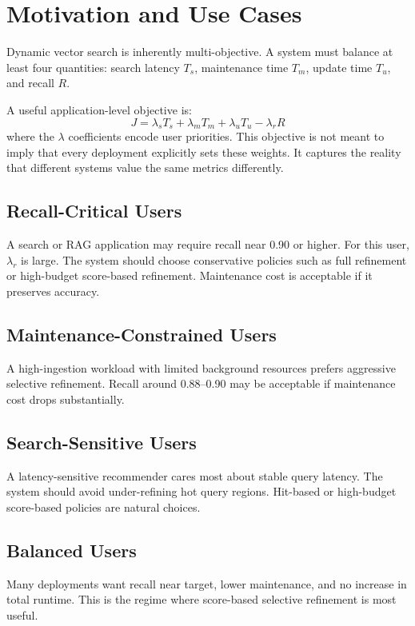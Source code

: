 \documentclass[sigconf, nonacm]{acmart}
\begin{document}
\section{Motivation and Use Cases}
\label{sec:motivation}

Dynamic vector search is inherently multi-objective. A system must
balance at least four quantities: search latency $T_s$, maintenance
time $T_m$, update time $T_u$, and recall $R$.

A useful application-level objective is:
\begin{equation}
  J = \lambda_s T_s + \lambda_m T_m + \lambda_u T_u - \lambda_r R
\end{equation}
where the $\lambda$ coefficients encode user priorities. This objective
is not meant to imply that every deployment explicitly sets these
weights. It captures the reality that different systems value the same
metrics differently.

\subsection{Recall-Critical Users}
A search or RAG application may require recall near 0.90 or higher.
For this user, $\lambda_r$ is large. The system should choose
conservative policies such as full refinement or high-budget
score-based refinement. Maintenance cost is acceptable if it preserves
accuracy.

\subsection{Maintenance-Constrained Users}
A high-ingestion workload with limited background resources prefers
aggressive selective refinement. Recall around 0.88--0.90 may be
acceptable if maintenance cost drops substantially.

\subsection{Search-Sensitive Users}
A latency-sensitive recommender cares most about stable query latency.
The system should avoid under-refining hot query regions. Hit-based or
high-budget score-based policies are natural choices.

\subsection{Balanced Users}
Many deployments want recall near target, lower maintenance, and no
increase in total runtime. This is the regime where score-based
selective refinement is most useful.
\end{document}
